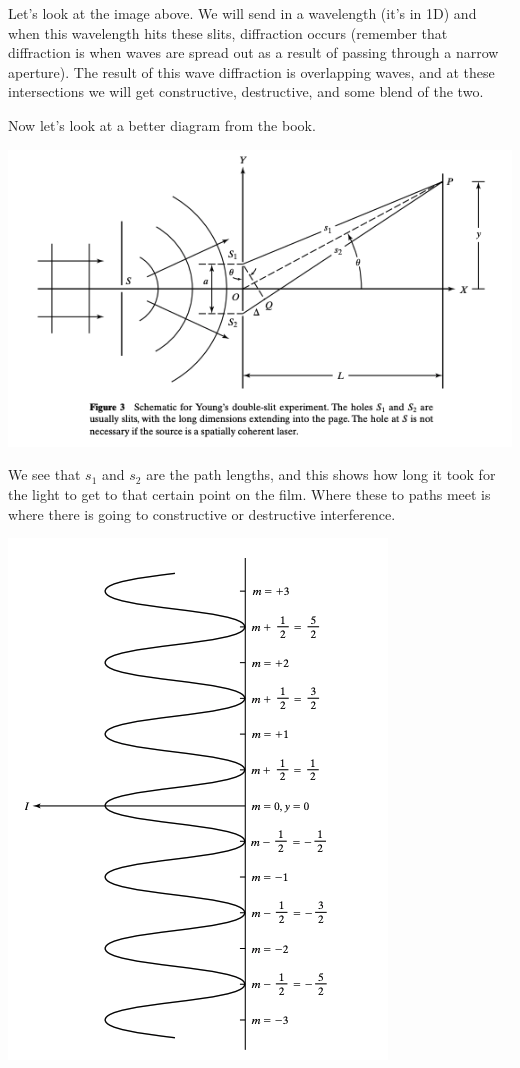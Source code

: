 \documentclass[10pt]{article}
\begin{document}
Let's look at the image above. We will send in a wavelength (it's in 1D) and when this wavelength hits these slits, diffraction occurs (remember that diffraction is when waves are spread out as a result of passing through a narrow aperture). The result of this wave diffraction is overlapping waves, and at these intersections we will get constructive, destructive, and some blend of the two.

\newblock

Now let's look at a better diagram from the book.

\newpage

\begin{center}
    \includegraphics*[scale = .5]{imgs/book-young-experiment.png}
\end{center}

We see that $s_1$ and $s_2$ are the path lengths, and this shows how long it took for the light to get to that certain point on the film. Where these to paths meet is where there is going to constructive or destructive interference. 

\begin{center}
    \includegraphics*[scale = .5]{imgs/film-young.png}
\end{center}
\end{document}
